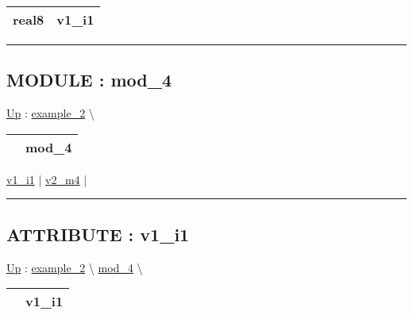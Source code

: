 {\renewcommand{\arraystretch}{1.5}
\begin{tabularx}{\textwidth}{|>{\raggedright\arraybackslash}l|X|}
\hline
\hspace{0pt}real8 & v1\_i1 \\
\hline
\end{tabularx}
}

\par


\rule{\linewidth}{0.5pt}


\subsection*{MODULE : mod\_4}
\hypertarget{ecldoc:intest.example_2.mod_4}{}
\hyperlink{ecldoc:intest.example_2}{Up} :
\hspace{0pt} \hyperlink{ecldoc:intest.example_2}{example_2} \textbackslash 

{\renewcommand{\arraystretch}{1.5}
\begin{tabularx}{\textwidth}{|>{\raggedright\arraybackslash}l|X|}
\hline
\hspace{0pt} & mod\_4 \\
\hline
\end{tabularx}
}

\par


\hyperlink{ecldoc:intest.example_2.mod_4.v1_i1}{v1\_i1}  |
\hyperlink{ecldoc:intest.example_2.mod_4.v2_m4}{v2\_m4}  |

\rule{\linewidth}{0.5pt}

\subsection*{ATTRIBUTE : v1\_i1}
\hypertarget{ecldoc:intest.example_2.mod_4.v1_i1}{}
\hyperlink{ecldoc:intest.example_2.mod_4}{Up} :
\hspace{0pt} \hyperlink{ecldoc:intest.example_2}{example_2} \textbackslash 
\hspace{0pt} \hyperlink{ecldoc:intest.example_2.mod_4}{mod_4} \textbackslash 

{\renewcommand{\arraystretch}{1.5}
\begin{tabularx}{\textwidth}{|>{\raggedright\arraybackslash}l|X|}
\hline
\hspace{0pt} & v1\_i1 \\
\hline
\end{tabularx}
}

\par

